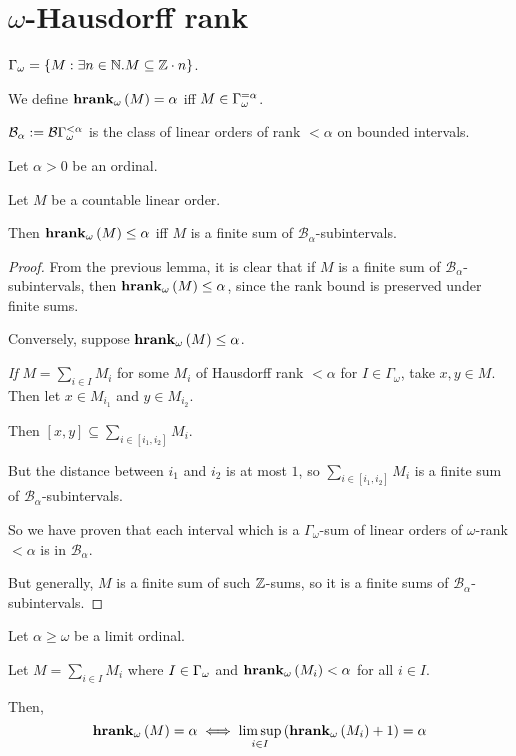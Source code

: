 \section{\texorpdfstring{$\omega$}{omega}-Hausdorff rank}

\begin{definitions}
  $\Gamma_{\omega} = \left\{ {M : \exists n \in \mathbb{N} . M \subseteq \mathbb{Z} \cdot n} \right\}$.

  We define $\mathbf{hrank}_{\omega}\left( M \right) = \alpha$ iff $M \in \Gamma_{\omega}^{= \alpha}$.

  $\mathcal{B}_{\alpha} := \mathcal{B}{\Gamma_{\omega}^{< \alpha}}$ is the class
  of linear orders of rank $< \alpha$ on bounded intervals.
\end{definitions}

\begin{lemma}
  Let $\alpha > 0$ be an ordinal.

  Let $M$ be a countable linear order.

  Then $\mathbf{hrank}_{\omega}\left( M \right) \le \alpha$ iff $M$ is a finite sum of $\mathcal{B}_{\alpha}$-subintervals.
\end{lemma}

\begin{proof}
  From the previous lemma, it is clear that if $M$ is a finite sum of $\mathcal{B}_{\alpha}$-subintervals,
  then $\mathbf{hrank}_{\omega}\left( M \right) \le \alpha$, since the rank bound is preserved under finite sums.

  Conversely, suppose $\mathbf{hrank}_{\omega}\left( M \right) \le \alpha$.

  \emph{If} $M = \sum_{i \in I} M_i$ for some $M_i$ of Hausdorff rank $< \alpha$ for $I \in \Gamma_{\omega}$,
  take $x, y \in M$. Then let $x \in M_{i_1}$ and $y \in M_{i_2}$.

  Then $[x, y] \subseteq \sum_{i \in [i_1, i_2]} M_i$.

  But the distance between $i_1$ and $i_2$ is at most $1$, so $\sum_{i \in [i_1, i_2]} M_i$ is a finite sum of
  $\mathcal{B}_{\alpha}$-subintervals.

  So we have proven that each interval which is a $\Gamma_{\omega}$-sum of linear orders of
  $\omega$-rank $< \alpha$ is in $\mathcal{B}_{\alpha}$.

  But generally, $M$ is a finite sum of such $\mathbb{Z}$-sums, so it is a finite sums
  of $\mathcal{B}_{\alpha}$-subintervals.
\end{proof}

\begin{lemma}
  Let $\alpha \ge \omega$ be a limit ordinal.

  Let $M = \sum_{i \in I} M_i$ where $I \in \Gamma_{\omega}$ and $\mathbf{hrank}_{\omega}\left( M_i \right) < \alpha$
  for all $i \in I$.

  Then,
  \[\mathbf{hrank}_{\omega}\left( M \right) = \alpha \iff \limsup_{i \in I} \left( {\mathbf{hrank}_{\omega}\left( M_i \right)+1} \right) = \alpha\]
\end{lemma}

